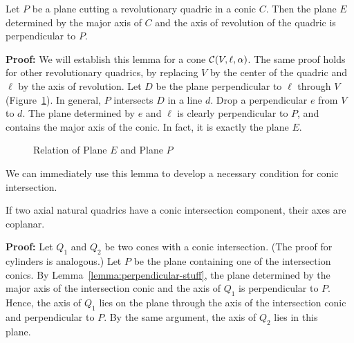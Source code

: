 \begin{lemma}
\label{lemma:perpendicular-stuff}
     Let $P$ be a plane cutting a revolutionary quadric in a conic $C$.
Then the plane $E$ determined by the major axis of $C$ and the axis of 
revolution of the quadric is perpendicular to $P$.
\end{lemma}
{\bf Proof:} We will establish this lemma for a 
cone ${\cal C}(V,\ell,\alpha)$.
The same proof holds for other revolutionary quadrics, by replacing $V$
by the center of the quadric and $\ell$ by the axis of revolution.
Let $D$ be the plane
perpendicular to $\ell$ through $V$ (Figure~\ref{fig:perpendicular-stuff}).
In general, $P$ intersects $D$ in a line $d$.  Drop a perpendicular $e$ from
$V$ to $d$.  The plane determined by $e$ and $\ell$ is clearly perpendicular
to $P$, and contains the major axis of the conic.  In fact, it is exactly the
plane $E$. \ \ \ \ \QED
\begin{figure}
\vspace{5.5cm}
\caption{Relation of Plane $E$ and Plane $P$}
\label{fig:perpendicular-stuff}
\end{figure}

We can immediately use this lemma to develop a necessary condition for
conic intersection.

\begin{lemma}
\label{lemma:non-skew}
     If two axial natural quadrics have a conic intersection component, their 
axes are coplanar.  
\end{lemma}
{\bf Proof:}  Let $Q_1$ and $Q_2$ be two cones
with a conic intersection.  
(The proof for cylinders is analogous.)
Let $P$ be the plane containing one of the 
intersection conics.
By Lemma~\ref{lemma:perpendicular-stuff},  the plane determined by the major 
axis of the intersection  conic and the axis of $Q_1$ is perpendicular to $P$.
Hence, the axis of $Q_1$ lies on the plane through the axis of the 
intersection conic and perpendicular to $P$.  By the same argument, the axis
of $Q_2$ lies in this plane.\ \ \ \QED

